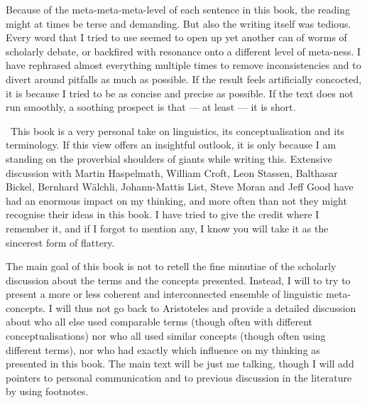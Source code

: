 Because of the meta-meta-meta-level of each sentence in this book, the reading might at times be terse and demanding. But also the writing itself was tedious. Every word that I tried to use seemed to open up yet another can of worms of scholarly debate, or backfired with resonance onto a different level of meta-ness. I have rephrased almost everything multiple times to remove inconsistencies and to divert around pitfalls as much as possible. If the result feels artificially concocted, it is because I tried to be as concise and precise as possible. If the text does not run smoothly, a soothing prospect is that --- at least --- it is short.



\ \newline This book is a very personal take on linguistics, its conceptualisation and its terminology. If this view offers an insightful outlook, it is only because I am standing on the proverbial shoulders of giants while writing this. Extensive discussion with Martin Haspelmath, William Croft, Leon Stassen, Balthasar Bickel, Bernhard Wälchli, Johann-Mattis List, Steve Moran and Jeff Good have had an enormous impact on my thinking, and more often than not they might recognise their ideas in this book. I have tried to give the credit where I remember it, and if I forgot to mention any, I know you will take it as the sincerest form of flattery.

The main goal of this book is not to retell the fine minutiae of the scholarly discussion about the terms and the concepts presented. Instead, I will to try to present a more or less coherent and interconnected ensemble of linguistic meta-concepts. I will thus not go back to Aristoteles and provide a detailed discussion about who all else used comparable terms (though often with different conceptualisations) nor who all used similar concepts (though often using different terms), nor who had exactly which influence on my thinking as presented in this book. The main text will be just me talking, though I will add pointers to personal communication and to previous discussion in the literature by using footnotes.
